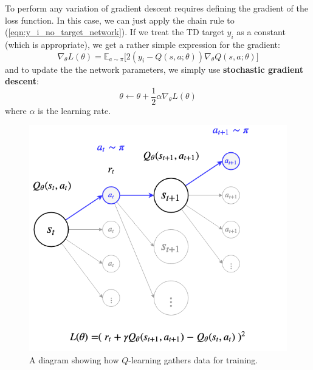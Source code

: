 \documentclass[journal, onecolumn, 12pt, draftclsnofoot]{IEEEtran}
\numberwithin{equation}{section}
\newcommand{\kword}[1]{\textbf{#1}}
\begin{document}
		\par To perform any variation of gradient descent requires defining the gradient of the loss function. In this case, we can just apply the chain rule to (\ref{eqn:y_i_no_target_network}). If we treat the TD target $y_i$ as a constant (which is appropriate), we get a rather simple expression for the gradient:
		\begin{equation}
			\label{eqn:q-learning-gradient-no-target}
			\nabla_\theta L(\theta) = \mathbb{E}_{a \sim \pi} \big[ 2(y_i - Q(s,a;\theta)) \nabla_\theta Q(s,a;\theta) \big]
		\end{equation}
		and to update the the network parameters, we simply use \kword{stochastic gradient descent}:
		\begin{equation}
			\label{eqn:SGD}
				\theta \gets \theta + \frac{1}{2} \alpha \nabla_\theta L(\theta)
		\end{equation}
		where $\alpha$ is the learning rate.

		\begin{figure}[ht]
			\centering
			\includegraphics[scale=0.5]{fig/state-transition-q-learning-loss.png}
			\caption{A diagram showing how $Q$-learning gathers data for training.}
			\label{fig:state-transition-q-learning-loss}
		\end{figure}
\end{document}
